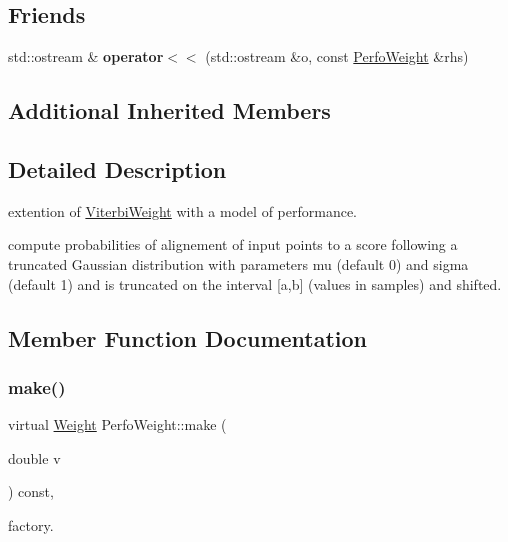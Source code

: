 \subsection*{Friends}
\begin{DoxyCompactItemize}
\item 
\mbox{\label{classPerfoWeight_a62a4cc4811e1d20cb8fc373cffd063a8}} 
std\+::ostream \& {\bfseries operator$<$$<$} (std\+::ostream \&o, const \mbox{\hyperlink{classPerfoWeight}{Perfo\+Weight}} \&rhs)
\end{DoxyCompactItemize}
\subsection*{Additional Inherited Members}


\subsection{Detailed Description}
extention of \mbox{\hyperlink{classViterbiWeight}{Viterbi\+Weight}} with a model of performance. 

compute probabilities of alignement of input points to a score following a truncated Gaussian distribution with parameters mu (default 0) and sigma (default 1) and is truncated on the interval \mbox{[}a,b\mbox{]} (values in samples) and shifted. 

\subsection{Member Function Documentation}
\mbox{\label{classPerfoWeight_ad9237d9b3fccf6f0b70133e10c1103b2}} 
\subsubsection{\texorpdfstring{make()}{make()}}
{\footnotesize\ttfamily virtual \mbox{\hyperlink{classWeight}{Weight}} Perfo\+Weight\+::make (\begin{DoxyParamCaption}\item[{double}]{v }\end{DoxyParamCaption}) const\hspace{0.3cm}{\ttfamily [inline]}, {\ttfamily [virtual]}}



factory. 

